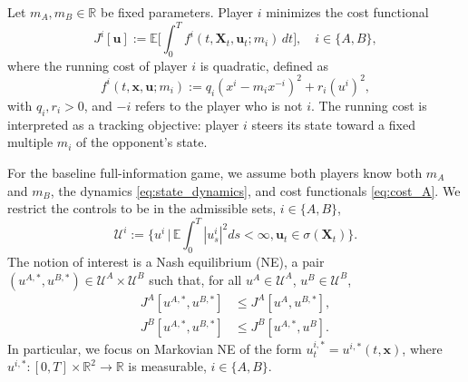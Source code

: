 \documentclass[letterpaper, 10 pt, conference]{ieeeconf}
\newcommand{\E}{\mathbb E}
\newcommand{\B}{\mathcal B}
\newcommand{\R}{\mathbb R}
\begin{document}
Let $m_A, m_B \in \R$ be fixed parameters. Player $i$ minimizes the cost functional 
\begin{equation}
    \label{eq:cost_A}
    J^i[\bm u] := \E\!\Big[\int_0^T f^i(t,\bm{X}_t,\bm{u}_t;m_i)\, dt\Big], \quad i \in \{A,B\},
\end{equation}
where the running cost of player $i$ is quadratic, defined as 
\begin{equation*}
    f^i(t,\bm{x},\bm{u};m_i) := q_i(x^i - m_i x^{-i})^2 + r_i (u^i)^2,
\end{equation*}
with $q_i, r_i > 0$, and $-i$ refers to the player who is not $i$.  
The running cost is interpreted as a tracking objective: player $i$ steers its state toward a fixed  multiple $m_i$ of the opponent's state.

For the baseline full-information game, we assume both players know both $m_A$ and $m_B$, the dynamics \eqref{eq:state_dynamics}, and cost functionals \eqref{eq:cost_A}.  We restrict the controls to be in the admissible sets, $i \in \{A,B\}$,
\begin{equation*}
    \mathcal{U}^{i} := \Big\{u^{i} \, \Big| \, \E\int_0^T |u_s^i|^2  ds < \infty, \bm{u}_t \in \sigma(\bm{X}_t)\Big\}.
\end{equation*}
The notion of interest is a Nash equilibrium (NE), a pair $(u^{A, \ast}, u^{B, \ast}) \in \mathcal{U}^A \times \mathcal{U}^B$ such that, for all $u^A \in \mathcal{U}^A$, $u^B \in \mathcal{U}^B$,
\begin{align*}
    J^{A}[u^{A, \ast}, u^{B,\ast}] &\leq J^{A}[u^{A}, u^{B,\ast}], \\
    J^{B}[u^{A, \ast}, u^{B,\ast}] &\leq J^{B}[u^{A,\ast}, u^{B}].
\end{align*}
In particular, we focus on Markovian NE of the form $u^{i, \ast}_t = u^{i, \ast}(t, \bm x)$, where $u^{i, \ast}: [0,T] \times \R^2 \to \R$ is measurable, \(i\in\{A,B\}\).



\end{document}
